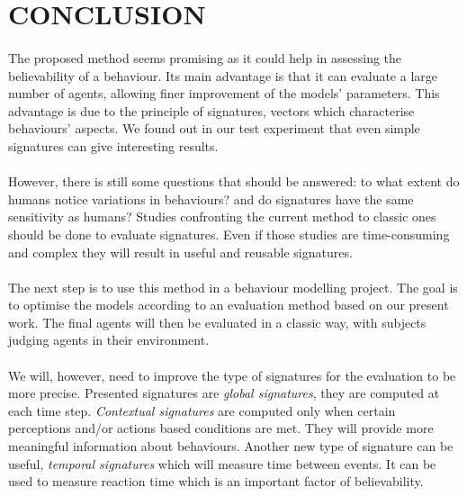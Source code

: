 \documentclass[a4paper,twocolumn]{article}
\begin{document}
\section{CONCLUSION}
\paragraph{}%
The proposed method seems promising as it could help in assessing the believability of a behaviour. Its main advantage is that it can evaluate a large number of agents, allowing finer improvement of the models' parameters. This advantage is due to the principle of signatures, vectors which characterise behaviours' aspects. We found out in our test experiment that even simple signatures can give interesting results.
\paragraph{}%
However, there is still some questions that should be answered: to what extent do humans notice variations in behaviours? and do signatures have the same sensitivity as humans? Studies confronting the current method to classic ones should be done to evaluate signatures. Even if those studies are time-consuming and complex they will result in useful and reusable signatures.
\paragraph{}%
The next step is to use this method in a behaviour modelling project. The goal is to optimise the models according to an evaluation method based on our present work. The final agents will then be evaluated in a classic way, with subjects judging agents in their environment.
\paragraph{}%
We will, however, need to improve the type of signatures for the evaluation to be more precise. Presented signatures are \emph{global signatures}, they are computed at each time step. \emph{Contextual signatures} are computed only when certain perceptions and/or actions based conditions are met. They will provide more meaningful information about behaviours. Another new type of signature can be useful, \emph{temporal signatures} which will measure time between events. It can be used to measure reaction time which is an important factor of believability.



\end{document}
